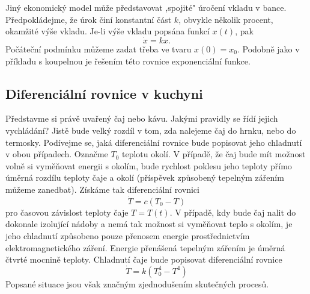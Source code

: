       Jiný ekonomický model může představovat ,spojité" úročení vkladu v bance. Předpokládejme, že
      úrok činí konstantní část \(k\), obvykle několik procent, okamžité výše vkladu. Je-li výše
      vkladu popsána funkcí \(x(t)\), pak
      \begin{equation*}
        \dot{x} = kx.
      \end{equation*}
      Počáteční podmínku můžeme zadat třeba ve tvaru \(x(0) = x_0\). Podobně jako v příkladu s 
      koupelnou je řešením této rovnice exponenciální funkce.
      
    \subsection{Diferenciální rovnice v kuchyni}
      Představme si právě uvařený čaj nebo kávu. Jakými pravidly se řídí jejich vychládání? Jistě
      bude velký rozdíl v tom, zda nalejeme čaj do hrnku, nebo do termosky. Podívejme se, jaká
      diferenciální rovnice bude popisovat jeho chladnutí v obou případech. Označme \(T_0\) teplotu
      okolí. V případě, že čaj bude mít možnost volně si vyměňovat energii s okolím, bude rychlost
      poklesu jeho teploty přímo úměrná rozdílu teploty čaje a okolí (příspěvek způsobený tepelným
      zářením můžeme zanedbat). Získáme tak diferenciální rovnici
      \begin{equation*}
        \dot{T} = c(T_0 - T)
      \end{equation*}
      pro časovou závislost teploty čaje \(T = T(t)\). V případě, kdy bude čaj nalit do dokonale
      izolující nádoby a nemá tak možnost si vyměňovat teplo s okolím, je jeho chladnutí způsobeno
      pouze přenosem energie prostřednictvím elektromagnetického záření. Energie přenášená tepelným
      zářením je úměrná čtvrté mocnině teploty. Chladnutí čaje bude popisovat diferenciální rovnice
      \begin{equation*}
        \dot{T} = k(T_0^4 - T^4)
      \end{equation*}
      Popsané situace jsou však značným zjednodušením skutečných procesů.
    
